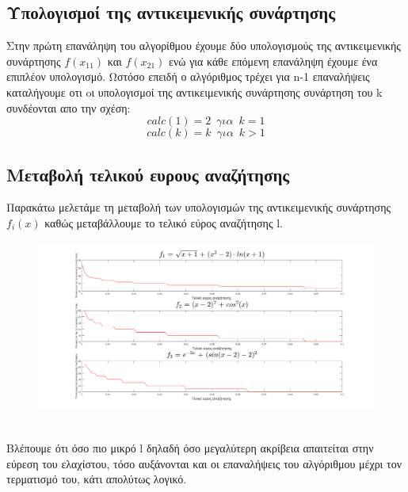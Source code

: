 \documentclass{article}
\begin{document}
  \subsection*{Υπολογισμοί της αντικειμενικής συνάρτησης}
  Στην πρώτη επανάληψη του αλγορίθμου έχουμε δύο υπολογισμούς της αντικειμενικής συνάρτησης $f(x_{11})$ και $f(x_{21})$ ενώ για κάθε επόμενη επανάληψη έχουμε ένα επιπλέον υπολογισμό. Ωστόσο επειδή ο αλγόριθμος τρέχει για n-1 επαναλήψεις καταλήγουμε οτι oι υπολογισμοί της αντικειμενικής συνάρτησης συνάρτηση του k συνδέονται απο την σχέση:
\begin{equation*}
calc(1) = 2  \enspace για  \enspace k = 1
\end{equation*}
\begin{equation*}
\boxed{calc(k) = k}   \enspace για  \enspace k > 1
\end{equation*}
\newpage
\subsection*{Μεταβολή τελικού ευρους αναζήτησης}
Παρακάτω μελετάμε τη μεταβολή των υπολογισμών της αντικειμενικής συνάρτησης $f_i(x)$
καθώς μεταβάλλουμε το τελικό εύρος αναζήτησης l.
\begin{figure}[h!]	
     \centering
     \advance\leftskip-4.75cm 
  \includegraphics[width=220mm,scale=2]{thema3a.png}
\end{figure} \\
Βλέπουμε ότι όσο πιο μικρό l δηλαδή όσο μεγαλύτερη ακρίβεια απαιτείται στην εύρεση του
ελαχίστου, τόσο αυξάνονται και οι επαναλήψεις του αλγόριθμου μέχρι τον τερματισμό του, κάτι
απολύτως λογικό.
 \clearpage
\end{document}
